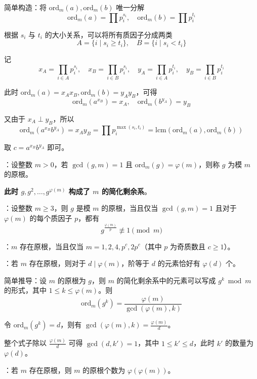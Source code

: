 \begin{quoteblock}
简单构造：将 $\mathrm{ord}_m(a), \mathrm{ord}_m(b)$ 唯一分解
\[
\mathrm{ord}_m(a) = \prod p_i^{s_i}, \quad
\mathrm{ord}_m(b) = \prod p_i^{t_i}
\]

根据 $s_i$ 与 $t_i$ 的大小关系，可以将所有质因子分成两类
\[
A = \{ i \mid s_i \geq t_i \}, \quad B = \{ i \mid s_i < t_i \}
\]

记
\[
x_A = \prod_{i \in A} p_i^{s_i}, \quad
x_B = \prod_{i \in B} p_i^{s_i}, \quad
y_A = \prod_{i \in A} p_i^{t_i}, \quad
y_B = \prod_{i \in B} p_i^{t_i}
\]

此时 $\mathrm{ord}_m(a) = x_Ax_B, \mathrm{ord}_m(b) = y_Ay_B$，可得
\[
\mathrm{ord}_m(a^{x_B}) = x_A, \quad
\mathrm{ord}_m(b^{y_A}) = y_B
\]

又由于 $x_A \perp y_B$，所以
\[
\mathrm{ord}_m(a^{x_B}b^{y_A}) = x_Ay_B = \prod p_i^{\max(s_i, t_i)} = \mathrm{lcm}(\mathrm{ord}_m(a), \mathrm{ord}_m(b))
\]

取 $c = a^{x_B}b^{y_A}$ 即可。
\end{quoteblock}

：设整数 $m > 0$，若 $\gcd(g, m) = 1$ 且 $\mathrm{ord}_m(g) = \varphi(m)$，则称 $g$ 为模 $m$ 的原根。

\textbf{此时 $g, g^2, \dots, g^{\varphi(m)}$ 构成了 $m$ 的简化剩余系}。

：设整数 $m \geq 3$，则 $g$ 是模 $m$ 的原根，当且仅当 $\gcd(g, m) = 1$ 且对于 $\varphi(m)$ 的每个质因子 $p$，都有
\[
g^{\frac{\varphi(m)}{p}} \not\equiv 1 \pmod m
\]

：$m$ 存在原根，当且仅当 $m = 1, 2, 4, p^c, 2p^c$（其中 $p$ 为奇质数且 $c \geq 1$）。

：若 $m$ 存在原根，则对于 $d \mid \varphi(m)$，阶等于 $d$ 的元素恰好有 $\varphi(d)$ 个。

\begin{quoteblock}
简单推导：设 $m$ 的原根为 $g$，则 $m$ 的简化剩余系中的元素可以写成 $g^k \bmod m$ 的形式，其中 $1 \leq k \leq \varphi(m)$。则
\[
\mathrm{ord}_m(g^k) = \frac{\varphi(m)}{\gcd(\varphi(m), k)}
\]

令 $\mathrm{ord}_m(g^k) = d$，则有 $\gcd(\varphi(m), k) = \frac{\varphi(m)}{d}$。

整个式子除以 $\frac{\varphi(m)}{d}$ 可得 $\gcd(d, k') = 1$，其中 $1 \leq k' \leq d$，此时 $k'$ 的数量为 $\varphi(d)$。
\end{quoteblock}

：若 $m$ 存在原根，则 $m$ 的原根个数为 $\varphi(\varphi(m))$。

